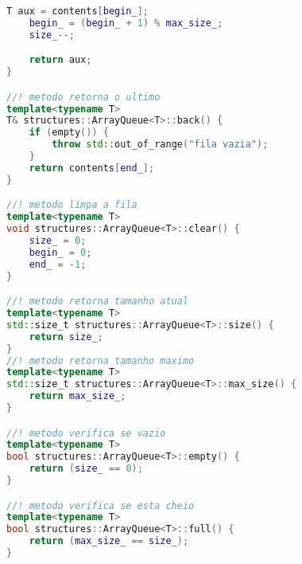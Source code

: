 \begin{lstlisting}[language=c++]
    T aux = contents[begin_];
    begin_ = (begin_ + 1) % max_size_;
    size_--;

    return aux;
}

//! metodo retorna o ultimo
template<typename T>
T& structures::ArrayQueue<T>::back() {
    if (empty()) {
        throw std::out_of_range("fila vazia");
    }
    return contents[end_];
}

//! metodo limpa a fila
template<typename T>
void structures::ArrayQueue<T>::clear() {
    size_ = 0;
    begin_ = 0;
    end_ = -1;
}

//! metodo retorna tamanho atual
template<typename T>
std::size_t structures::ArrayQueue<T>::size() {
    return size_;
}
//! metodo retorna tamanho maximo
template<typename T>
std::size_t structures::ArrayQueue<T>::max_size() {
    return max_size_;
}

//! metodo verifica se vazio
template<typename T>
bool structures::ArrayQueue<T>::empty() {
    return (size_ == 0);
}

//! metodo verifica se esta cheio
template<typename T>
bool structures::ArrayQueue<T>::full() {
    return (max_size_ == size_);
}
\end{lstlisting}